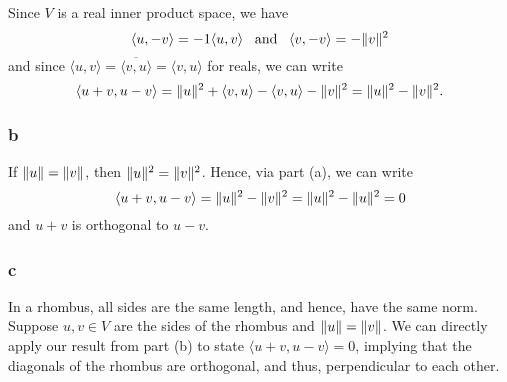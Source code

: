 \documentclass{article}
\begin{document}
Since $V$ is a real inner product space, we have
\[\langle u,-v\rangle=-1\langle u,v\rangle \;\;\;\text{and}\;\;\; \langle v,-v\rangle=-\lVert v\rVert^2\]
and since $\langle u,v\rangle=\overline{\langle v,u\rangle}=\langle v,u \rangle$ for reals, we can write
\[\langle u+v,u-v\rangle=\lVert u\rVert^2+\langle v,u\rangle -\langle v,u \rangle - \lVert v\rVert^2=\lVert u\rVert^2 - \lVert v\rVert^2.\]

\subsubsection*{b}
If $\lVert u\rVert = \lVert v\rVert$, then $\lVert u\rVert^2 = \lVert v\rVert^2$. 
Hence, via part (a), we can write
\[\langle u+v,u-v\rangle=\lVert u\rVert^2 - \lVert v\rVert^2=\lVert u\rVert^2 -\lVert u\rVert^2=0\]
and $u+v$ is orthogonal to $u-v$.

\subsubsection*{c}
In a rhombus, all sides are the same length, and hence, have the same norm. 
Suppose $u,v\in V$ are the sides of the rhombus and $\lVert u\rVert = \lVert v\rVert$. 
We can directly apply our result from part (b) to state $\langle u+v,u-v\rangle=0$, implying that the diagonals of the rhombus are orthogonal, and thus, perpendicular to each other.
\end{document}
